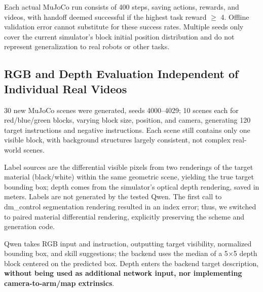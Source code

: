 Each actual MuJoCo run consists of 400 steps, saving actions, rewards, and videos, with handoff deemed successful if the highest task reward \(\geq\) 4. Offline validation error cannot substitute for these success rates. Multiple seeds only cover the current simulator's block initial position distribution and do not represent generalization to real robots or other tasks.

\subsection{RGB and Depth Evaluation Independent of Individual Real Videos}\label{s04-detail-2}

30 new MuJoCo scenes were generated, seeds 4000--4029; 10 scenes each for red/blue/green blocks, varying block size, position, and camera, generating 120 target instructions and negative instructions. Each scene still contains only one visible block, with background structures largely consistent, not complex real-world scenes.

Label sources are the differential visible pixels from two renderings of the target material (black/white) within the same geometric scene, yielding the true target bounding box; depth comes from the simulator's optical depth rendering, saved in meters. Labels are not generated by the tested Qwen. The first call to dm\_control segmentation rendering resulted in an index error; thus, we switched to paired material differential rendering, explicitly preserving the scheme and generation code.


Qwen takes RGB input and instruction, outputting target visibility, normalized bounding box, and skill suggestions; the backend uses the median of a 5\(\times\)5 depth block centered on the predicted box. Depth enters the backend target description, \textbf{without being used as additional network input, nor implementing camera-to-arm/map extrinsics}.

